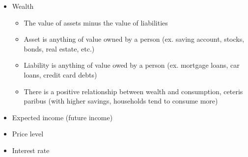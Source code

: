 \documentclass[12pt]{article}
\begin{document}
\begin{enumerate}
\begin{enumerate}
\begin{enumerate}
\begin{enumerate}
\begin{itemize}
\begin{itemize}
                        \end{itemize}

                      \item Wealth

                        \begin{itemize}

                          \item The value of assets minus the value of liabilities

                          \item Asset is anything of value owned by a person (ex. saving account, stocks, bonds, real estate, etc.)

                          \item Liability is anything of value owed by a person (ex. mortgage loans, car loans, credit card debts)

                          \item There is a positive relationship between wealth and consumption, ceteris paribus (with higher savings, households tend to consume more)

                        \end{itemize}
                        
                      \item Expected income (future income)

                      \item Price level

                      \item Interest rate

                    \end{itemize}

                \end{enumerate}

            \end{enumerate}

        \end{enumerate}

    \end{enumerate}
\end{document}
